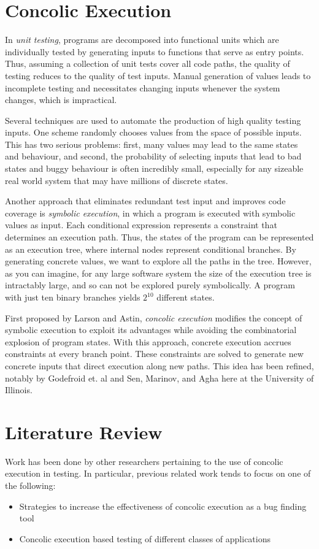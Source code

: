 \documentclass[11pt]{article}
\begin{document}
\section{Concolic Execution}
In \textit{unit testing}, programs are decomposed into functional units which
are individually tested by generating inputs to functions that serve as entry
points. Thus, assuming a collection of unit tests cover all code paths, the
quality of testing reduces to the quality of test inputs. Manual generation of
values leads to incomplete testing and necessitates changing inputs whenever the
system changes, which is impractical. \par
Several techniques are used to automate
the production of high quality testing inputs. One scheme randomly chooses
values from the space of possible inputs. This has two serious problems: first,
many values may lead to the same states and behaviour, and second, the
probability of selecting inputs that lead to bad states and buggy behaviour is
often incredibly small, especially for any sizeable real world system that may
have millions of discrete states. \par
Another approach that eliminates redundant
test input and improves code coverage is \textit{symbolic execution}, in which a
program is executed with symbolic values as input. Each conditional expression
represents a constraint that determines an execution path. Thus, the states of
the program can be represented as an execution tree, where internal nodes
represent conditional branches. By generating concrete values, we want to
explore all the paths in the tree. However, as you can imagine, for any large
software system the size of the execution tree is intractably large, and so can
not be explored purely symbolically. A program with just ten binary branches
yields $2^{10}$ different states. \par
First proposed by Larson and Astin, \textit{concolic execution} modifies the concept of symbolic execution to
exploit its advantages while avoiding the combinatorial explosion of program
states. With this approach, concrete execution accrues constraints at every
branch point. These constraints are solved to generate new concrete inputs that
direct execution along new paths. This idea has been refined, notably by
Godefroid et. al and Sen, Marinov, and Agha here at the University of Illinois. 

\section{Literature Review}
Work has been done by other researchers pertaining to the use of concolic
execution in testing. In particular, previous related work
tends to focus on one of the following:
\begin{itemize}
\item Strategies to increase the effectiveness of concolic execution as a bug
finding tool
\item Concolic execution based testing of different classes of applications
\end{itemize}
\end{document}
